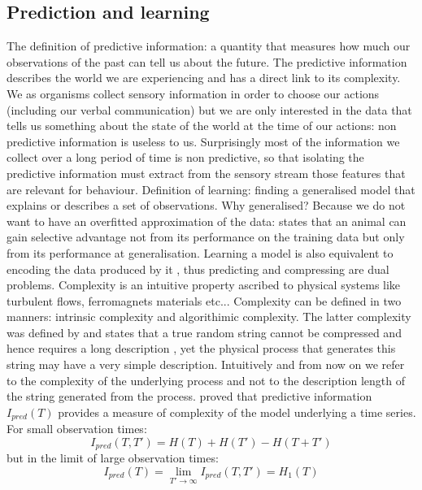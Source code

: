 \subsection{Prediction and learning}
\label{Appendix:PredictionAndLearning}
The definition of predictive information: a quantity that measures how much our
observations of the past can tell us about the future. The predictive information
 describes the world we are experiencing and has a direct link to its complexity.
We as organisms collect sensory information in order to choose our actions
(including our verbal communication) but we are only interested in the data
 that tells us something about the state of the world at the time of our actions:
 non predictive information is useless to us. Surprisingly most of the information
 we collect over a long period of time is non predictive, so that isolating the
predictive information must extract from the sensory stream those features that
 are relevant for behaviour.
Definition of learning: finding a generalised model that explains or describes
 a set of observations. Why generalised?
Because we do not want to have an overfitted approximation of the data: \citep{Vapnik1998:StatisticalLearningTheory}
 states that an animal can gain selective advantage not from its performance on the
 training data but only from its performance at generalisation.
Learning a model is also equivalent to encoding the data produced by it \citep{Rissanen1989:Complexity},
thus predicting and compressing are dual problems.
Complexity is an intuitive property ascribed to physical systems like turbulent flows,
ferromagnets materials etc...
Complexity can be defined in two manners: intrinsic complexity and algorithimic complexity.
The latter complexity was defined by and states that a true random string
 cannot be compressed and hence requires a long description \citep{Kolmogorov1965:InfoDefinition}, yet
 the physical process that generates this string may have a very simple description.
Intuitively and from now on we refer to the complexity of the underlying process
 and not to the description length of the string generated from the process.
\citet{Bialek2001:Complexity} proved that predictive information $I_{pred}(T)$ provides
 a measure of complexity of the model underlying a time series. For small observation times:
\begin{equation}
I_{pred}(T,T')=H(T)+H(T')-H(T+T')\label{Ipredgeneral}
\end{equation}
 but in the limit of large observation times:
\begin{equation}
I_{pred}(T)=\lim_{T'\to\infty} I_{pred}(T,T')=H_{1}(T)
\end{equation}
